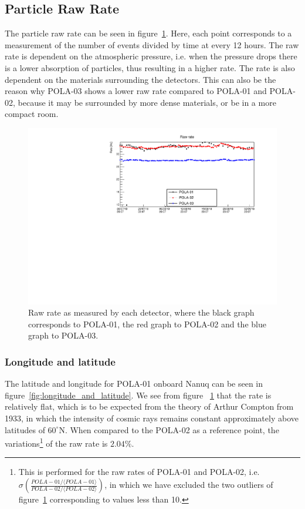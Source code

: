\documentclass[12pt,a4paper]{amsart}
\begin{document}
\subsection{Particle Raw Rate}
The particle raw rate can be seen in figure~\ref{fig:RawRate}. Here, each point corresponds to a measurement of the number of events divided by time at every 12 hours. The raw rate is dependent on the atmospheric pressure, i.e. when the pressure drops there is a lower absorption of particles, thus resulting in a higher rate. The rate is also dependent on the materials surrounding the detectors. This can also be the reason why POLA-03 shows a lower raw rate compared to POLA-01 and POLA-02, because it may be surrounded by more dense materials, or be in a more compact room.

\begin{figure}
	\centering
	\includegraphics[width=\textwidth]{../data/plots/RawRate_all.pdf}
	\caption{Raw rate as measured by each detector, where the black graph corresponds to POLA-01, the red graph to POLA-02 and the blue graph to POLA-03.}
	\label{fig:RawRate}
\end{figure}

\subsubsection{Longitude and latitude}
The latitude and longitude for POLA-01 onboard Nanuq can be seen in figure~\ref{fig:longitude_and_latitude}. We see from figure ~\ref{fig:RawRate} that the rate is relatively flat, which is to be expected from the theory of Arthur Compton from 1933, in which the intensity of cosmic rays remains constant approximately above latitudes of $60^\circ$N. When compared to the POLA-02 as a reference point, the variations\footnote{This is performed for the raw rates of POLA-01 and POLA-02, i.e. $\sigma\left(\frac{POLA-01/\langle POLA-01\rangle}{POLA-02/\langle POLA-02 \rangle}\right)$, in which we have excluded the two outliers of figure~\ref{fig:RawRate} corresponding to values less than 10.} of the raw rate is $2.04\%$. 
\end{document}
